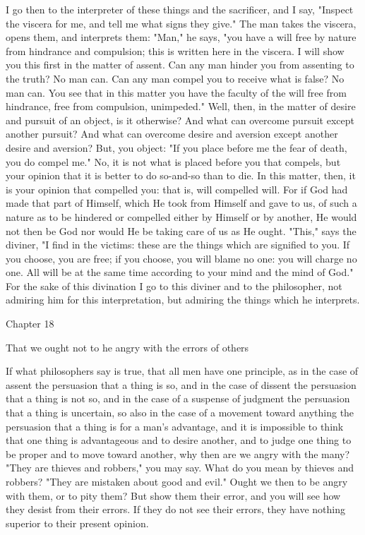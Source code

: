 \documentclass[a4paper]{article}
\begin{document}
I go then to the interpreter of these things and the sacrificer, and
I say, "Inspect the viscera for me, and tell me what signs they give."
The man takes the viscera, opens them, and interprets them: "Man,"
he says, "you have a will free by nature from hindrance and compulsion;
this is written here in the viscera. I will show you this first in
the matter of assent. Can any man hinder you from assenting to the
truth? No man can. Can any man compel you to receive what is false?
No man can. You see that in this matter you have the faculty of the
will free from hindrance, free from compulsion, unimpeded." Well,
then, in the matter of desire and pursuit of an object, is it otherwise?
And what can overcome pursuit except another pursuit? And what can
overcome desire and aversion except another desire and aversion? But,
you object: "If you place before me the fear of death, you do compel
me." No, it is not what is placed before you that compels, but your
opinion that it is better to do so-and-so than to die. In this matter,
then, it is your opinion that compelled you: that is, will compelled
will. For if God had made that part of Himself, which He took from
Himself and gave to us, of such a nature as to be hindered or compelled
either by Himself or by another, He would not then be God nor would
He be taking care of us as He ought. "This," says the diviner, "I
find in the victims: these are the things which are signified to you.
If you choose, you are free; if you choose, you will blame no one:
you will charge no one. All will be at the same time according to
your mind and the mind of God." For the sake of this divination I
go to this diviner and to the philosopher, not admiring him for this
interpretation, but admiring the things which he interprets.

Chapter 18

That we ought not to he angry with the errors of others 

If what philosophers say is true, that all men have one principle,
as in the case of assent the persuasion that a thing is so, and in
the case of dissent the persuasion that a thing is not so, and in
the case of a suspense of judgment the persuasion that a thing is
uncertain, so also in the case of a movement toward anything the persuasion
that a thing is for a man's advantage, and it is impossible to think
that one thing is advantageous and to desire another, and to judge
one thing to be proper and to move toward another, why then are we
angry with the many? "They are thieves and robbers," you may say.
What do you mean by thieves and robbers? "They are mistaken about
good and evil." Ought we then to be angry with them, or to pity them?
But show them their error, and you will see how they desist from their
errors. If they do not see their errors, they have nothing superior
to their present opinion. 
\end{document}
